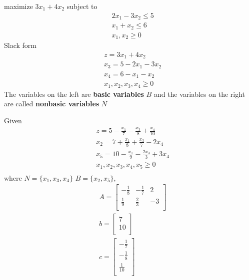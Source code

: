\documentclass[11pt]{article}
\begin{document}
\begin{example}
    maximize $3x_1 + 4 x_2$ subject to 
    \begin{align*}  
        & 2x_1 - 3x_2\leq 5 \\
        & x_1 + x_2 \leq 6 \\
        & x_1, x_2 \geq 0
    \end{align*}
    Slack form 
    \begin{align*}
        & z = 3x_1 + 4x_2 \\
        & x_3 = 5 - 2x_1 - 3x_2\\
        & x_4 = 6 - x_1 - x_2 \\
        & x_1, x_2, x_3, x_4 \geq 0
    \end{align*}
    The variables on the left are \textbf{basic variables} $B$ and the variables on the right are called \textbf{nonbasic variables} $N$
\end{example}


\begin{example}
    Given 
    \begin{align*}
        & z = 5 - \frac{x_1}{7} - \frac{x_3}{8} + \frac{x_4}{10}\\
        & x_2 = 7 + \frac{x_1}{8} + \frac{x_3}{7} - 2x_4 \\
        & x_5 = 10 - \frac{x_1}{9} - \frac{2x_3}{3} + 3x_4 \\
        & x_1, x_2, x_3, x_4, x_5 \geq 0\\
    \end{align*}
    where $N = \{ x_1, x_3, x_4 \}$ $B = \{ x_2, x_5\}$,
    \begin{align*}
        & A = \begin{bmatrix}
            -\frac{1}{8} & -\frac{1}{7} & 2 \\
            \frac{1}{9} &  \frac{2}{3} & -3 \\
        \end{bmatrix} \\
        & b = \begin{bmatrix}
            7 \\
            10 \\
        \end{bmatrix} \\
        & c = \begin{bmatrix}
            -\frac{1}{7}\\
            -\frac{1}{8} \\
            \frac{1}{10}\\
        \end{bmatrix} \\
    \end{align*}
\end{example}
\end{document}
